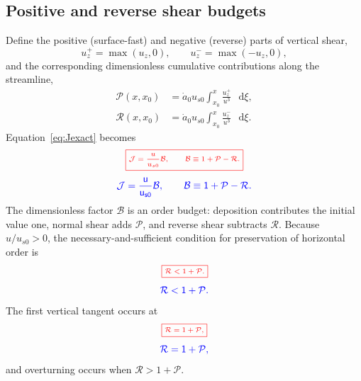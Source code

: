 \documentclass[review]{igs}
\providecommand{\DIFadd}[1]{{\protect\color{blue} \sf #1}} %
\providecommand{\DIFdel}[1]{{\protect\color{red} \scriptsize #1}} %
\providecommand{\DIFaddbegin}{} %
\providecommand{\DIFaddend}{} %
\providecommand{\DIFdelbegin}{} %
\providecommand{\DIFdelend}{} %
\newcommand{\DIFscaledelfig}{0.5}
\newlength{\DIFdelgraphicswidth} %
\newlength{\DIFdelgraphicsheight} %
\newcommand{\DIFaddincludegraphics}[2][]{{\color{blue}\fbox{\DIFOincludegraphics[#1]{#2}}}} %
\newcommand{\DIFdelincludegraphics}[2][]{%
\sbox{\DIFdelgraphicsbox}{\DIFOincludegraphics[#1]{#2}}%
\settoboxwidth{\DIFdelgraphicswidth}{\DIFdelgraphicsbox} %
\settoboxtotalheight{\DIFdelgraphicsheight}{\DIFdelgraphicsbox} %
\scalebox{\DIFscaledelfig}{%
\parbox[b]{\DIFdelgraphicswidth}{\usebox{\DIFdelgraphicsbox}\\[-\baselineskip] \rule{\DIFdelgraphicswidth}{0em}}\llap{\resizebox{\DIFdelgraphicswidth}{\DIFdelgraphicsheight}{%
\setlength{\unitlength}{\DIFdelgraphicswidth}%
\begin{picture}(1,1)%
\thicklines\linethickness{2pt} %
{\color[rgb]{1,0,0}\put(0,0){\framebox(1,1){}}}%
{\color[rgb]{1,0,0}\put(0,0){\line( 1,1){1}}}%
{\color[rgb]{1,0,0}\put(0,1){\line(1,-1){1}}}%
\end{picture}%
}\hspace*{3pt}}} %
} %
\DeclareRobustCommand{\DIFaddbegin}{\DIFOaddbegin \let\includegraphics\DIFaddincludegraphics} %
\DeclareRobustCommand{\DIFaddend}{\DIFOaddend \let\includegraphics\DIFOincludegraphics} %
\DeclareRobustCommand{\DIFdelbegin}{\DIFOdelbegin \let\includegraphics\DIFdelincludegraphics} %
\DeclareRobustCommand{\DIFdelend}{\DIFOaddend \let\includegraphics\DIFOincludegraphics} %
\begin{document}
\subsection{Positive and reverse shear budgets}

Define \DIFaddbegin \DIFadd{the positive (surface-fast) and negative (reverse) parts of vertical shear,
}\DIFaddend \begin{equation}
 u_z^+=\max(u_z,0),
 \qquad
 u_z^-=\max(-u_z,0),
\end{equation}
and the \DIFaddbegin \DIFadd{corresponding }\DIFaddend dimensionless cumulative contributions \DIFaddbegin \DIFadd{along the streamline,
}\DIFaddend \begin{align}
\mathcal{P}(x,x_0)
&=\dot a_0u_{s0}
\int_{x_0}^{x}\frac{u_z^+}{u^3}\,\mathop{}\!\mathrm{d}\xi,
\label{eq:Pdef}\\
\mathcal{R}(x,x_0)
&=\dot a_0u_{s0}
\int_{x_0}^{x}\frac{u_z^-}{u^3}\,\mathop{}\!\mathrm{d}\xi.
\label{eq:Rdef}
\end{align}
Equation~\ref{eq:Jexact} becomes
\DIFdelbegin \begin{displaymath}
\DIFdel{\boxed{
\mathcal{J}=\frac{u}{u_{s0}}\mathcal{B},
\qquad
\mathcal{B}\equiv1+\mathcal{P}-\mathcal{R}.
}
}\end{displaymath}%
\DIFdelend \DIFaddbegin \begin{equation}
\DIFadd{\mathcal{J}=\frac{u}{u_{s0}}\mathcal{B},
\qquad
\mathcal{B}\equiv1+\mathcal{P}-\mathcal{R}.
\label{eq:JPR}
}\end{equation}\DIFaddend 
The dimensionless factor \(\mathcal{B}\) is an order budget: deposition contributes the initial value one, normal shear adds \(\mathcal{P}\), and reverse shear subtracts \(\mathcal{R}\). Because \(u/u_{s0}>0\), the necessary-and-sufficient condition for preservation of horizontal order is
\DIFdelbegin \begin{displaymath}
\DIFdel{\boxed{\mathcal{R}<1+\mathcal{P}.}
}\end{displaymath}%
\DIFdelend \DIFaddbegin \begin{equation}
\DIFadd{\mathcal{R}<1+\mathcal{P}.
\label{eq:ordercondition}
}\end{equation}\DIFaddend 
The first vertical tangent occurs at
\DIFdelbegin \begin{displaymath}
\DIFdel{\boxed{\mathcal{R}=1+\mathcal{P},}
}\end{displaymath}%
\DIFdelend \DIFaddbegin \begin{equation}
\DIFadd{\mathcal{R}=1+\mathcal{P},
\label{eq:verticalcondition}
}\end{equation}\DIFaddend 
and overturning occurs when \(\mathcal{R}>1+\mathcal{P}\).
\end{document}
